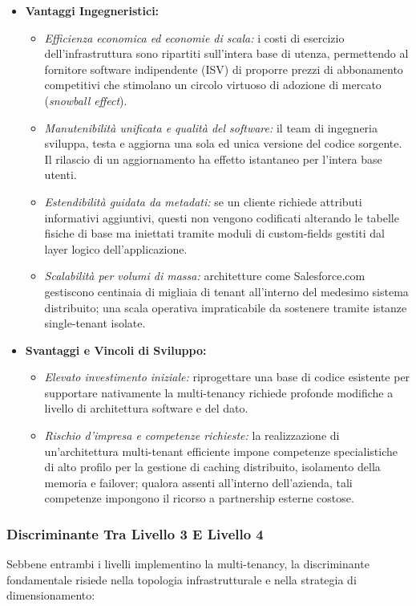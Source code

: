 \documentclass[11pt, a4paper]{article}
\begin{document}
\begin{itemize}
    \item \textbf{Vantaggi Ingegneristici:}
    \begin{itemize}[noitemsep]
        \item \emph{Efficienza economica ed economie di scala:} i costi di esercizio dell'infrastruttura sono ripartiti sull'intera base di utenza, permettendo al fornitore software indipendente (ISV) di proporre prezzi di abbonamento competitivi che stimolano un circolo virtuoso di adozione di mercato (\emph{snowball effect}).
        \item \emph{Manutenibilità unificata e qualità del software:} il team di ingegneria sviluppa, testa e aggiorna una sola ed unica versione del codice sorgente. Il rilascio di un aggiornamento ha effetto istantaneo per l'intera base utenti.
        \item \emph{Estendibilità guidata da metadati:} se un cliente richiede attributi informativi aggiuntivi, questi non vengono codificati alterando le tabelle fisiche di base ma iniettati tramite moduli di custom-fields gestiti dal layer logico dell'applicazione.
        \item \emph{Scalabilità per volumi di massa:} architetture come Salesforce.com gestiscono centinaia di migliaia di tenant all'interno del medesimo sistema distribuito; una scala operativa impraticabile da sostenere tramite istanze single-tenant isolate.
    \end{itemize}

    \item \textbf{Svantaggi e Vincoli di Sviluppo:}
    \begin{itemize}[noitemsep]
        \item \emph{Elevato investimento iniziale:} riprogettare una base di codice esistente per supportare nativamente la multi-tenancy richiede profonde modifiche a livello di architettura software e del dato.
        \item \emph{Rischio d'impresa e competenze richieste:} la realizzazione di un'architettura multi-tenant efficiente impone competenze specialistiche di alto profilo per la gestione di caching distribuito, isolamento della memoria e failover; qualora assenti all'interno dell'azienda, tali competenze impongono il ricorso a partnership esterne costose.
    \end{itemize}
\end{itemize}

\subsubsection{Discriminante Tra Livello 3 E Livello 4}
Sebbene entrambi i livelli implementino la multi-tenancy, la discriminante fondamentale risiede nella topologia infrastrutturale e nella strategia di dimensionamento:
\end{document}
